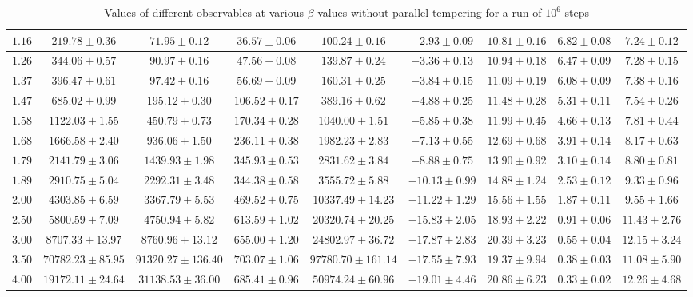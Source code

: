 \begin{sidewaystable}[t!]
\begin{tabular}{|c|c|c|c|c|c|c|c|c|}
    \hline
    $1.16$ & $219.78 \pm 0.36$ & $71.95 \pm 0.12$ & $36.57 \pm 0.06$ & $100.24 \pm 0.16$ & $-2.93 \pm 0.09$ & $10.81 \pm 0.16$ & $6.82 \pm 0.08$ & $7.24 \pm 0.12$ \\
    \hline
    $1.26$ & $344.06 \pm 0.57$ & $90.97 \pm 0.16$ & $47.56 \pm 0.08$ & $139.87 \pm 0.24$ & $-3.36 \pm 0.13$ & $10.94 \pm 0.18$ & $6.47 \pm 0.09$ & $7.28 \pm 0.15$ \\
    \hline
    $1.37$ & $396.47 \pm 0.61$ & $97.42 \pm 0.16$ & $56.69 \pm 0.09$ & $160.31 \pm 0.25$ & $-3.84 \pm 0.15$ & $11.09 \pm 0.19$ & $6.08 \pm 0.09$ & $7.38 \pm 0.16$ \\
    \hline
    $1.47$ & $685.02 \pm 0.99$ & $195.12 \pm 0.30$ & $106.52 \pm 0.17$ & $389.16 \pm 0.62$ & $-4.88 \pm 0.25$ & $11.48 \pm 0.28$ & $5.31 \pm 0.11$ & $7.54 \pm 0.26$ \\
    \hline
    $1.58$ & $1122.03 \pm 1.55$ & $450.79 \pm 0.73$ & $170.34 \pm 0.28$ & $1040.00 \pm 1.51$ & $-5.85 \pm 0.38$ & $11.99 \pm 0.45$ & $4.66 \pm 0.13$ & $7.81 \pm 0.44$ \\
    \hline
    $1.68$ & $1666.58 \pm 2.40$ & $936.06 \pm 1.50$ & $236.11 \pm 0.38$ & $1982.23 \pm 2.83$ & $-7.13 \pm 0.55$ & $12.69 \pm 0.68$ & $3.91 \pm 0.14$ & $8.17 \pm 0.63$ \\
    \hline
    $1.79$ & $2141.79 \pm 3.06$ & $1439.93 \pm 1.98$ & $345.93 \pm 0.53$ & $2831.62 \pm 3.84$ & $-8.88 \pm 0.75$ & $13.90 \pm 0.92$ & $3.10 \pm 0.14$ & $8.80 \pm 0.81$ \\
    \hline
    $1.89$ & $2910.75 \pm 5.04$ & $2292.31 \pm 3.48$ & $344.38 \pm 0.58$ & $3555.72 \pm 5.88$ & $-10.13 \pm 0.99$ & $14.88 \pm 1.24$ & $2.53 \pm 0.12$ & $9.33 \pm 0.96$ \\
    \hline
    $2.00$ & $4303.85 \pm 6.59$ & $3367.79 \pm 5.53$ & $469.52 \pm 0.75$ & $10337.49 \pm 14.23$ & $-11.22 \pm 1.29$ & $15.56 \pm 1.55$ & $1.87 \pm 0.11$ & $9.55 \pm 1.66$ \\
    \hline
    $2.50$ & $5800.59 \pm 7.09$ & $4750.94 \pm 5.82$ & $613.59 \pm 1.02$ & $20320.74 \pm 20.25$ & $-15.83 \pm 2.05$ & $18.93 \pm 2.22$ & $0.91 \pm 0.06$ & $11.43 \pm 2.76$ \\
    \hline
    $3.00$ & $8707.33 \pm 13.97$ & $8760.96 \pm 13.12$ & $655.00 \pm 1.20$ & $24802.97 \pm 36.72$ & $-17.87 \pm 2.83$ & $20.39 \pm 3.23$ & $0.55 \pm 0.04$ & $12.15 \pm 3.24$ \\
    \hline
    $3.50$ & $70782.23 \pm 85.95$ & $91320.27 \pm 136.40$ & $703.07 \pm 1.06$ & $97780.70 \pm 161.14$ & $-17.55 \pm 7.93$ & $19.37 \pm 9.94$ & $0.38 \pm 0.03$ & $11.08 \pm 5.90$ \\
    \hline
    $4.00$ & $19172.11 \pm 24.64$ & $31138.53 \pm 36.00$ & $685.41 \pm 0.96$ & $50974.24 \pm 60.96$ & $-19.01 \pm 4.46$ & $20.86 \pm 6.23$ & $0.33 \pm 0.02$ & $12.26 \pm 4.68$ \\
    \hline
    \end{tabular}
    \caption{Values of different observables at various $\beta$ values without parallel tempering for a run of $10 ^6$ steps}
    \label{pre_mmc}
    \end{sidewaystable}


